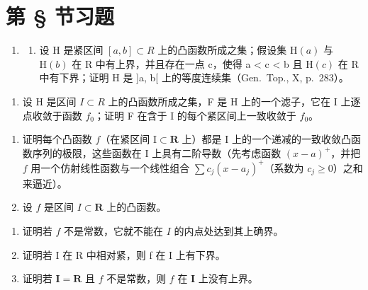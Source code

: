 \section*{第 \S{} 节习题}
{}

\begin{enumerate}
\def\labelenumi{\arabic{enumi})}
\tightlist
\item
  \begin{enumerate}
  \def\labelenumii{\alph{enumii})}
  \tightlist
  \item
    设 H 是紧区间 \([a, b] \subset R\) 上的凸函数所成之集；假设集 \(\mathrm{H}(a)\) 与 \(\mathrm{H}(b)\) 在 R 中有上界，并且存在一点 c，使得 a \textless{} c \textless{} b 且 \(\mathrm{H}(c)\) 在 R 中有下界；证明 H 是 {]}a, b{[} 上的等度连续集（Gen.~Top., X, p.~283）。
  \end{enumerate}
\end{enumerate}

\begin{enumerate}
\def\labelenumi{\alph{enumi})}
\setcounter{enumi}{1}
\tightlist
\item
  设 H 是区间 \(I \subset R\) 上的凸函数所成之集，F 是 H 上的一个滤子，它在 I 上逐点收敛于函数 \(f_{0}\)；证明 F 在含于 I 的每个紧区间上一致收敛于 \(f_{0}\)。
\end{enumerate}

\begin{enumerate}
\def\labelenumi{\arabic{enumi})}
\setcounter{enumi}{1}
\item
  证明每个凸函数 \(f\)（在紧区间 \(\mathrm{I} \subset \mathbf{R}\) 上）都是 \(\mathrm{I}\) 上的一个递减的一致收敛凸函数序列的极限，这些函数在 \(\mathrm{I}\) 上具有二阶导数（先考虑函数 \((x - a)^+\)，并把 \(f\) 用一个仿射线性函数与一个线性组合 \(\sum c_j(x - a_j)^+\)（系数为 \(c_j \geqslant 0\)）之和来逼近）。
\item
  设 \(f\) 是区间 \(I \subset \mathbf{R}\) 上的凸函数。
\end{enumerate}

\begin{enumerate}
\def\labelenumi{\alph{enumi})}
\item
  证明若 \(f\) 不是常数，它就不能在 \(I\) 的内点处达到其上确界。
\item
  证明若 I 在 R 中相对紧，则 f 在 I 上有下界。
\item
  证明若 \(\mathbf{I} = \mathbf{R}\) 且 \(f\) 不是常数，则 \(f\) 在 \(\mathbf{I}\) 上没有上界。
\end{enumerate}

